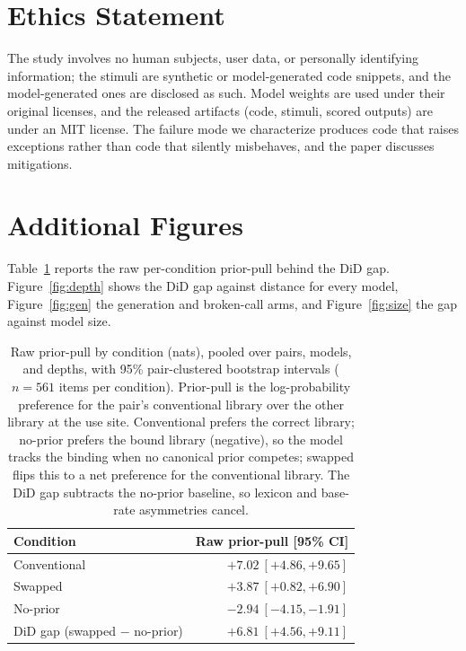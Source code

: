 \documentclass[11pt]{article}
\begin{document}
\section*{Ethics Statement}

The study involves no human subjects, user data, or personally identifying information; the stimuli are synthetic or model-generated code snippets, and the model-generated ones are disclosed as such. Model weights are used under their original licenses, and the released artifacts (code, stimuli, scored outputs) are under an MIT license. The failure mode we characterize produces code that raises exceptions rather than code that silently misbehaves, and the paper discusses mitigations.

\clearpage



\clearpage

\appendix

\section{Additional Figures}
\label{sec:appendix}

Table~\ref{tab:raw} reports the raw per-condition prior-pull behind the DiD gap. Figure~\ref{fig:depth} shows the DiD gap against distance for every model, Figure~\ref{fig:gen} the generation and broken-call arms, and Figure~\ref{fig:size} the gap against model size.

\begin{table}[t]
\centering
\small
\begin{tabular}{lr}
\toprule
\textbf{Condition} & \textbf{Raw prior-pull [95\% CI]} \\
\midrule
Conventional & $+7.02\ [+4.86, +9.65]$ \\
Swapped      & $+3.87\ [+0.82, +6.90]$ \\
No-prior     & $-2.94\ [-4.15, -1.91]$ \\
\midrule
DiD gap (swapped $-$ no-prior) & $+6.81\ [+4.56, +9.11]$ \\
\bottomrule
\end{tabular}
\caption{Raw prior-pull by condition (nats), pooled over pairs, models, and depths, with 95\% pair-clustered bootstrap intervals ($n{=}561$ items per condition). Prior-pull is the log-probability preference for the pair's conventional library over the other library at the use site. Conventional prefers the correct library; no-prior prefers the bound library (negative), so the model tracks the binding when no canonical prior competes; swapped flips this to a net preference for the conventional library. The DiD gap subtracts the no-prior baseline, so lexicon and base-rate asymmetries cancel.}
\label{tab:raw}
\end{table}
\end{document}
